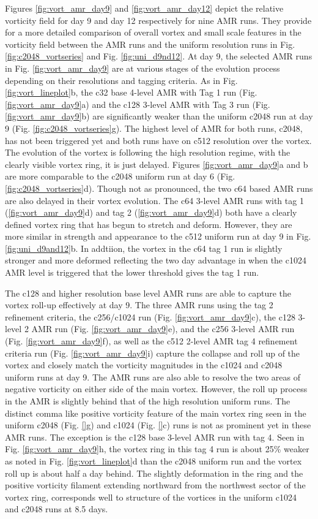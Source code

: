 Figures \ref{fig:vort_amr_day9} and \ref{fig:vort_amr_day12} depict the relative 
vorticity field for day 9 and day 12 respectively for nine AMR runs. They provide 
for a more detailed comparison of overall vortex and small scale features in the 
vorticity field between the AMR runs and the uniform resolution runs in 
Fig. \ref{fig:c2048_vortseries} and Fig. \ref{fig:uni_d9nd12}. At day 9, the selected
AMR runs in Fig. \ref{fig:vort_amr_day9} are at various stages of the 
evolution process depending on their resolutions and tagging criteria. As in 
Fig. \ref{fig:vort_lineplot}b, the c32 base 4-level AMR with Tag 1 run (Fig. 
\ref{fig:vort_amr_day9}a) and the c128 3-level AMR with Tag 3 run (Fig.
\ref{fig:vort_amr_day9}b) are significantly weaker than the uniform c2048 run
at day 9 (Fig. \ref{fig:c2048_vortseries}g). The highest level of AMR for both runs, c2048,
has not been triggered yet and both runs have on c512 resolution over the vortex.
 The evolution of the vortex is following the high resolution regime, with the clearly visible
 vortex ring, it is just delayed. Figures \ref{fig:vort_amr_day9}a and b are more comparable to
the c2048 uniform run at day 6 (Fig. \ref{fig:c2048_vortseries}d). Though not as pronounced,
the two c64 based AMR runs are also delayed in their vortex evolution. The c64 3-level AMR runs
with tag 1 (\ref{fig:vort_amr_day9}d) and tag 2  (\ref{fig:vort_amr_day9}d) both have a clearly
defined vortex ring that has begun to stretch and deform. However, they are more similar 
in strength and appearance to the c512 uniform run at day 9 in Fig. \ref{fig:uni_d9and12}b. 
In addtiion, the vortex in the c64 tag 1 run is slightly stronger and more deformed reflecting the
two day advantage in when the c1024 AMR level is triggered that the lower threshold
gives the tag 1 run.

The c128 and higher resolution base level AMR runs are able to capture the vortex roll-up
effectively at day 9. The three AMR runs using the tag 2 refinement criteria, 
the c256/c1024 run (Fig. \ref{fig:vort_amr_day9}c), the c128 3-level 2 AMR run
(Fig. \ref{fig:vort_amr_day9}e), and the c256 3-level AMR run (Fig. \ref{fig:vort_amr_day9}f),
as well as the c512 2-level AMR tag 4 refinement criteria run (Fig. \ref{fig:vort_amr_day9}i)
capture the collapse and roll up of the vortex and closely match the vorticity magnitudes
 in the c1024 and c2048 uniform runs at day 9. 
The AMR runs are also able to resolve  the two areas of negative vorticity 
on either side of the main vortex. However, the roll up process in the AMR is slightly
behind that of the high resolution uniform runs. The distinct comma like positive vorticity 
feature of the main vortex ring seen in the uniform c2048 (Fig. \ref{}g) and c1024 (Fig. \ref{}c) runs
is not as prominent yet in these AMR runs. 
The exception is the c128 base 3-level AMR run with tag 4. Seen in
Fig. \ref{fig:vort_amr_day9}h, the vortex ring in this tag 4 run 
is about 25\% weaker as noted in Fig. \ref{fig:vort_lineplot}d than the c2048 uniform run and  the vortex
roll up is about half a day behind. The slightly deformation in the ring and the positive vorticity filament 
extending northward from the northwest sector of the vortex ring, corresponds well to structure of
the vortices in the uniform c1024 and c2048 runs at 8.5 days. 

